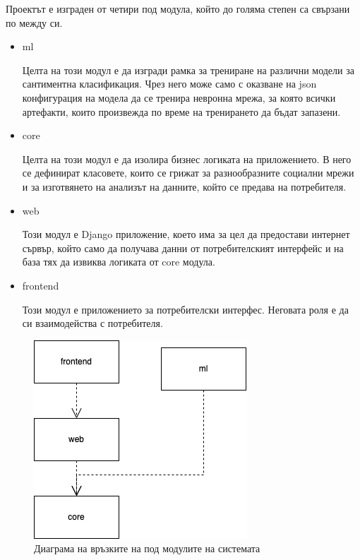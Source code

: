 \documentclass{article}
\begin{document}
Проектът е изграден от четири под модула, който до голяма степен са свързани по между си.

\begin{itemize}

  \item ml

  Целта на този модул е да изгради рамка за трениране на различни модели за сантиментна класификация. Чрез него може
  само с оказване на json конфигурация на модела да се тренира невронна мрежа, за която всички артефакти, които
  произвежда по време на тренирането да бъдат запазени.

  \item core

  Целта на този модул е да изолира бизнес логиката на приложението. В него се дефинират класовете, които се грижат за
  разнообразните социални мрежи и за изготвянето на анализът на данните, който се предава на потребителя.

  \item web

  Този модул е Django приложение, което има за цел да предостави интернет сървър, който само да получава данни от
  потребителският интерфейс и на база тях да извиква логиката от core модула.

  \item frontend

  Този модул е приложението за потребителски интерфес. Неговата роля е да си взаимодейства с потребителя.

\end{itemize}

\newpage\begin{figure}[H]
  \centering
  \captionsetup{justification=centering}
  \includegraphics{chapter-04/modules.png}
  \caption{Диаграма на връзките на под модулите на системата}
\end{figure}
\end{document}
